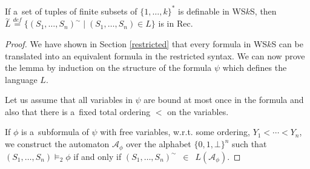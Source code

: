 \begin{lemma}
If a~set of tuples of finite subsets of $\{1,\ldots,k\}^*$ is definable in
WS$k$S, then $\overset{\sim}{L} \overset{\mathit{def}}{=}
\{(S_1,\ldots,S_n)^\sim \mid (S_1,\ldots,S_n) \in L\}$ is in Rec.
\end{lemma}

\begin{proof}
 We have shown in Section \ref{restricted} that every formula in WS$k$S can be
 translated into an equivalent formula in the restricted syntax. We can now
 prove the lemma by induction on the structure of the formula $\psi$ which
 defines the language $L$.

Let us assume that all variables in $\psi$ are bound at most once in the formula
and also that there is a~fixed total ordering $<$ on the variables.

If $\phi$ is a~subformula of $\psi$ with free variables, w.r.t. some ordering,
$Y_1 < \cdots < Y_n$, we construct the automaton $\mathcal{A}_\phi$ over the alphabet $\{0,1,\bot\}^n$
such that $(S_1,\ldots,S_n) \models_2 \phi$ if and only if
$(S_1,\ldots,S_n)^\sim$~$\in$~$L(\mathcal{A}_\phi)$.
\end{proof}

